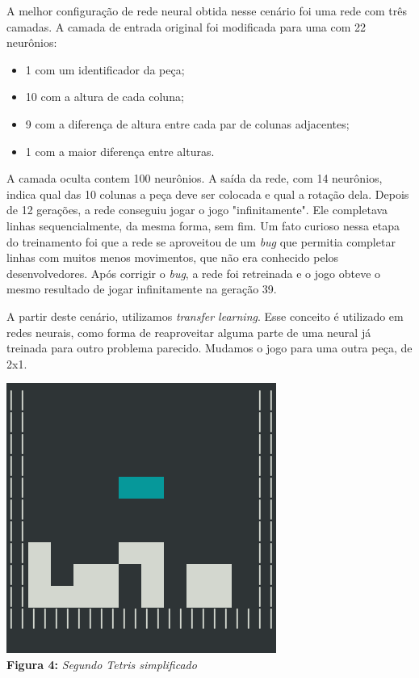 \documentclass[conference]{IEEEtran}
\begin{document}
A melhor configuração de rede neural obtida nesse cenário foi uma rede com três camadas. A camada de entrada original foi modificada para uma com 22 neurônios:  

\begin{itemize}
\item 1 com um identificador da peça;
\item 10 com a altura de cada coluna;
\item 9 com a diferença de altura entre cada par de colunas adjacentes;
\item 1 com a maior diferença entre alturas.
\end{itemize}

A camada oculta contem 100 neurônios. A saída da rede, com 14 neurônios, indica qual das 10 colunas a peça deve ser colocada e qual a rotação dela. Depois de 12 gerações, a rede conseguiu jogar o jogo "infinitamente". Ele completava linhas sequencialmente, da mesma forma, sem fim. Um fato curioso nessa etapa do treinamento foi que a rede se aproveitou de um \textit{bug} que permitia completar linhas com muitos menos movimentos, que não era conhecido pelos desenvolvedores. Após corrigir o \textit{bug}, a rede foi retreinada e o jogo obteve o mesmo resultado de jogar infinitamente na geração 39.

A partir deste cenário, utilizamos \textit{transfer learning}. Esse conceito é utilizado em redes neurais, como forma de reaproveitar alguma parte de uma neural já treinada para outro problema parecido. Mudamos o jogo para uma outra peça, de 2x1.

\begin{center}
\includegraphics[scale=0.3]{tetris_simples2.png}\\

\textbf{Figura 4:} \textit{Segundo Tetris simplificado}
\end{center}
\end{document}
